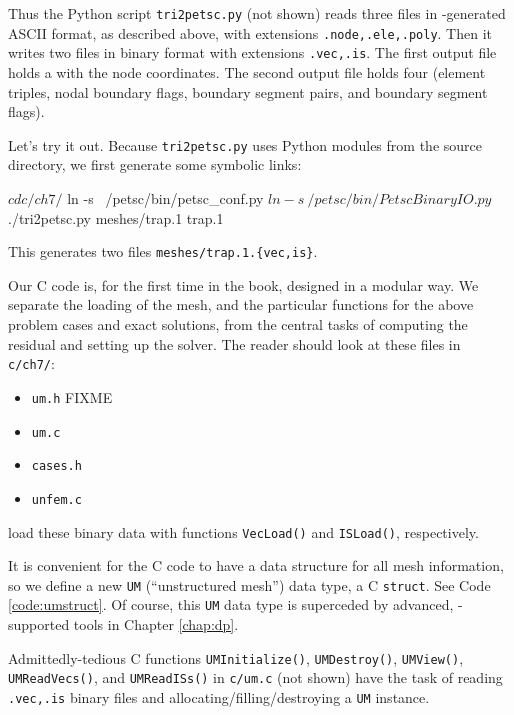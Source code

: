 Thus the Python script \texttt{tri2petsc.py} (not shown) reads three files in \Triangle-generated ASCII format, as described above, with extensions \texttt{.node,.ele,.poly}.  Then it writes two files in \PETSc binary format with extensions \texttt{.vec,.is}.  The first output file holds a \pVec with the node coordinates.  The second output file holds four \pISs (element triples, nodal boundary flags, boundary segment pairs, and boundary segment flags).

Let's try it out.  Because \texttt{tri2petsc.py} uses Python modules from the \PETSc source directory, we first generate some symbolic links:
\begin{cline}
$ cd c/ch7/
$ ln -s ~/petsc/bin/petsc_conf.py
$ ln -s ~/petsc/bin/PetscBinaryIO.py
$ ./tri2petsc.py meshes/trap.1 trap.1
\end{cline}
This generates two files \texttt{meshes/trap.1.\{vec,is\}}.

Our C code is, for the first time in the book, designed in a modular way.  We separate the loading of the mesh, and the particular functions for the above problem cases and exact solutions, from the central tasks of computing the residual and setting up the \PETSc solver.  The reader should look at these files in \texttt{c/ch7/}:
\begin{itemize}
\item \texttt{um.h} FIXME
\item \texttt{um.c} 
\item \texttt{cases.h} 
\item \texttt{unfem.c} 
\end{itemize}

 load these binary data with \PETSc functions  \texttt{VecLoad()} and \texttt{ISLoad()}, respectively.

It is convenient for the C code to have a data structure for all mesh information, so we define a new \texttt{UM} (``unstructured mesh'') data type, a C \texttt{struct}.  See Code \ref{code:umstruct}.  Of course, this \texttt{UM} data type is superceded by advanced, \PETSc-supported tools in Chapter \ref{chap:dp}.


Admittedly-tedious C functions \texttt{UMInitialize()}, \texttt{UMDestroy()}, \texttt{UMView()}, \texttt{UMReadVecs()}, and \texttt{UMReadISs()} in \texttt{c/\CODELOC um.c} (not shown) have the task of reading \texttt{.vec,.is} binary files and allocating/filling/destroying a \texttt{UM} instance.

